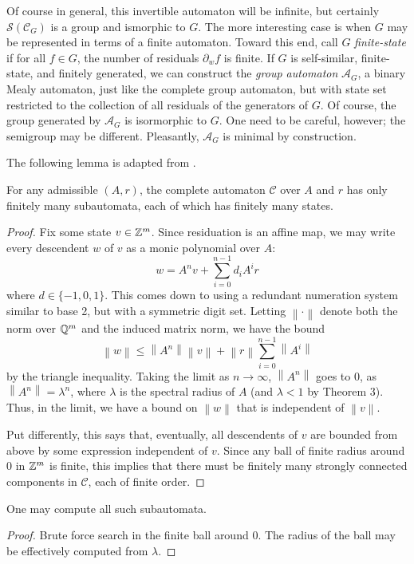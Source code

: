 \documentclass[11pt, titlepage]{article}
\newcommand{\norm}[1]{\left\lVert#1\right\rVert}
\begin{document}
Of course in general,
this invertible automaton will be infinite, but certainly
$\mathcal{S}(\mathcal{C}_G)$ is a group and ismorphic to $G$. The more
interesting case is when $G$ may be represented in terms of a finite
automaton. Toward this end, call $G$ \emph{finite-state} if for all
$f \in G$, the number of residuals $\partial_w f$ is finite. If $G$ is
self-similar, finite-state, and finitely generated, we can construct
the \emph{group automaton} $\mathcal{A}_G$, a binary Mealy automaton,
just like the complete group automaton, but with state set restricted
to the collection of all residuals of the generators of $G$. Of
course, the group generated by $\mathcal{A}_G$ is isormorphic to
$G$. One need to be careful, however; the semigroup may be
different. Pleasantly, $\mathcal{A}_G$ is minimal by construction.

The following lemma is adapted from \cite{okano:thesis}. 

\begin{lemma}
  For any admissible $(A, r)$, the complete automaton $\mathcal{C}$
  over $A$ and $r$ has only finitely many subautomata, each of which
  has finitely many states.
\end{lemma}
\begin{proof}
  Fix some state $v \in \mathbb{Z}^m$. Since residuation is an affine map, we
  may write every descendent $w$ of $v$ as a monic polynomial over $A$:
  \[
    w = A^nv + \sum_{i = 0}^{n-1}d_i A^i r
  \]
  where $d \in \{-1, 0, 1\}$. This comes down to using a redundant
  numeration system similar to base 2, but with a symmetric digit set.
  Letting $\norm{\cdot}$ denote both the norm over $\mathbb{Q}^m$ and the
  induced matrix norm, we have the bound
  \[
    \norm{w} \leq \norm{A^n}\norm{v} + \norm{r} \sum_{i=0}^{n-1} \norm{A^i}
  \]
  by the triangle inequality. Taking the limit as
  $n\rightarrow\infty$, $\norm{A^n}$ goes to 0, as
  $\norm{A^n} = \lambda^n$, where $\lambda$ is the spectral radius of
  $A$ (and $\lambda < 1$ by Theorem 3). Thus, in the limit, we have a
  bound on $\norm{w}$ that is independent of $\norm{v}$.

  Put differently, this says that, eventually, all descendents of $v$
  are bounded from above by some expression independent of $v$. Since
  any ball of finite radius around 0 in $\mathbb{Z}^m$ is finite, this implies
  that there must be finitely many strongly connected components in
  $\mathcal{C}$, each of finite order.
\end{proof}

\begin{lemma}
  One may compute all such subautomata.
\end{lemma}
\begin{proof}
  Brute force search in the finite ball around 0. The radius of the
  ball may be effectively computed from $\lambda$.
\end{proof}
\end{document}
